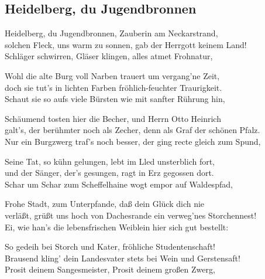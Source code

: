 
\subsection*{Heidelberg, du Jugendbronnen}
%

\thestrophe Heidelberg, du Jugendbronnen, Zauberin am Neckarstrand, \\
solchen Fleck, uns warm zu sonnen, gab der Herrgott keinem Land! \\
Schläger schwirren, Gläser klingen, alles atmet Frohnatur, \\

\thestrophe Wohl die alte Burg voll Narben trauert um vergang'ne Zeit, \\
doch sie tut's in lichten Farben fröhlich-feuchter Traurigkeit. \\
Schaut sie so aufs viele Bürsten wie mit sanfter Rührung hin, \\

\thestrophe Schäumend tosten hier die Becher, und Herrn Otto Heinrich \\
galt's, der berühmter noch als Zecher, denn als Graf der schönen Pfalz. \\
Nur ein Burgzwerg traf's noch besser, der ging recte gleich zum Spund, \\

\thestrophe Seine Tat, so kühn gelungen, lebt im Lled unsterblich fort, \\
und der Sänger, der's gesungen, ragt in Erz gegossen dort. \\
Schar um Schar zum Scheffelhaine wogt empor auf Waldespfad, \\

\thestrophe Frohe Stadt, zum Unterpfande, daß dein Glück dich nie \\
verläßt, grüßt uns hoch von Dachesrande ein verweg'nes Storchennest! \\
Ei, wie han's die lebensfrischen Weiblein hier sich gut bestellt: \\

\thestrophe So gedeih bei Storch und Kater, fröhliche Studentenschaft! \\
Brausend kling' dein Landesvater stets bei Wein und Gerstensaft! \\
Prosit deinem Sangesmeister, Prosit deinem großen Zwerg, \\
